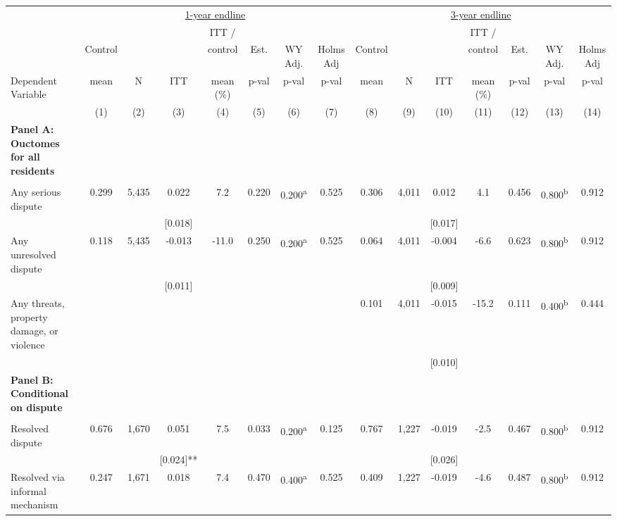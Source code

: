 \begin{tabular}{lcccccccccccccc}
\hline \noalign{\smallskip} & \multicolumn{7}{c}{\uline{\hfill 1-year endline \hfill}} & \multicolumn{7}{c}{\uline{\hfill 3-year endline \hfill}}\\
 &  &  &  & ITT / &  &  &  &  &  &  & ITT / &  &  & \\
 & Control &  &  & control & Est. & WY Adj. & Holms Adj & Control &  &  & control & Est. & WY Adj. & Holms Adj\\
Dependent Variable & mean & N & ITT & mean (\%) & p-val & p-val & p-val & mean & N & ITT & mean (\%) & p-val & p-val & p-val\\
 & (1) & (2) & (3) & (4) & (5) & (6) & (7) & (8) & (9) & (10) & (11) & (12) & (13) & (14)\\
\noalign{\smallskip}\hline \noalign{\smallskip}\textbf{Panel A: Ouctomes for all residents} &  &  &  &  &  &  &  &  &  &  &  &  &  & \\
 &  &  &  &  &  &  &  &  &  &  &  &  &  & \\
Any serious dispute & 0.299 & 5,435 & 0.022 & 7.2 & 0.220 & 0.200\textsuperscript{a} & 0.525 & 0.306 & 4,011 & 0.012 & 4.1 & 0.456 & 0.800\textsuperscript{b} & 0.912\\
 &  &  & [0.018] &  &  &  &  &  &  & [0.017] &  &  &  & \\
Any unresolved dispute & 0.118 & 5,435 & -0.013 & -11.0 & 0.250 & 0.200\textsuperscript{a} & 0.525 & 0.064 & 4,011 & -0.004 & -6.6 & 0.623 & 0.800\textsuperscript{b} & 0.912\\
 &  &  & [0.011] &  &  &  &  &  &  & [0.009] &  &  &  & \\
\phantom{} Any threats, property damage, or violence &  &  &  &  &  &  &  & 0.101 & 4,011 & -0.015 & -15.2 & 0.111 & 0.400\textsuperscript{b} & 0.444\\
 &  &  &  &  &  &  &  &  &  & [0.010] &  &  &  & \\
\textbf{Panel B: Conditional on dispute} &  &  &  &  &  &  &  &  &  &  &  &  &  & \\
 &  &  &  &  &  &  &  &  &  &  &  &  &  & \\
Resolved dispute & 0.676 & 1,670 & 0.051 & 7.5 & 0.033 & 0.200\textsuperscript{a} & 0.125 & 0.767 & 1,227 & -0.019 & -2.5 & 0.467 & 0.800\textsuperscript{b} & 0.912\\
 &  &  & [0.024]** &  &  &  &  &  &  & [0.026] &  &  &  & \\
\quad Resolved via informal mechanism & 0.247 & 1,671 & 0.018 & 7.4 & 0.470 & 0.400\textsuperscript{a} & 0.525 & 0.409 & 1,227 & -0.019 & -4.6 & 0.487 & 0.800\textsuperscript{b} & 0.912\\

\end{tabular}

